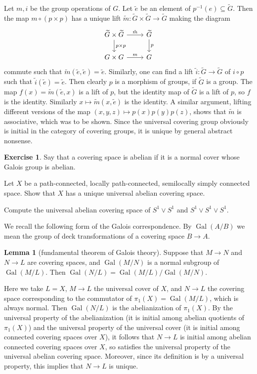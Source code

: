 \documentclass[10pt]{article}
\DeclareMathOperator{\Gal}{Gal}
\theoremstyle{definition}
\newtheorem{exer}{Exercise}
\newtheorem{lemma}{Lemma}[exer]
\begin{document}
Let $m,i$ be the group operations of $G$. Let $\tilde e$ be an element of $p^{-1}(e) \subseteq \widetilde G$.
Then the map $m \circ (p \times p)$ has a unique lift $\tilde m: \widetilde G \times \widetilde G \to \widetilde G$ making the diagram
$$\begin{tikzcd}
\widetilde G \times \widetilde G \arrow[r, "\tilde m"] \arrow[d,"p \times p"] & \widetilde G \arrow[d,"p"]\\
G \times G \arrow[r,"m"] & G
\end{tikzcd}$$
commute such that $\tilde m(\tilde e, \tilde e) = \tilde e$.
Similarly, one can find a lift $\tilde i: \widetilde G \to \widetilde G$ of $i \circ p$ such that $\tilde i(\tilde e) = \tilde e$.
Then clearly $p$ is a morphism of groups, if $\tilde G$ is a group.
The map $f(x) = \tilde m(\tilde e, x)$ is a lift of $p$, but the identity map of $\tilde G$ is a lift of $p$, so $f$ is the identity.
Similarly $x \mapsto \tilde m(x, \tilde e)$ is the identity.
A similar argument, lifting different versions of the map $(x, y, z) \mapsto p(x)p(y)p(z)$, shows that $\tilde m$ is associative, which was to be shown.
Since the universal covering group obviously is initial in the category of covering groups, it is unique by general abstract nonsense.

\begin{exer}
Say that a covering space is abelian if it is a normal cover whose Galois group is abelian.

Let $X$ be a path-connected, locally path-connected, semilocally simply connected space.
Show that $X$ has a unique universal abelian covering space.

Compute the universal abelian covering space of $S^1 \vee S^1$ and $S^1 \vee S^1 \vee S^1$.
\end{exer}

We recall the following form of the Galois correspondence. By $\Gal(A/B)$ we mean the group of deck transformations of a covering space $B \to A$.

\begin{lemma}[fundamental theorem of Galois theory]
Suppose that $M \to N$ and $N \to L$ are covering spaces, and $\Gal(M/N)$ is a normal subgroup of $\Gal(M/L)$.
Then $\Gal(N/L) = \Gal(M/L)/\Gal(M/N)$.
\end{lemma}

Here we take $L = X$, $M \to L$ the universal cover of $X$, and $N \to L$ the covering space corresponding to the commutator of $\pi_1(X) = \Gal(M/L)$, which is always normal.
Then $\Gal(N/L)$ is the abelianization of $\pi_1(X)$.
By the universal property of the abelianization (it is initial among abelian quotients of $\pi_1(X)$) and the universal property of the universal cover (it is initial among connected covering spaces over $X$), it follows that $N \to L$ is initial among abelian connected covering spaces over $X$, so satisfies the universal property of the universal abelian covering space.
Moreover, since its definition is by a universal property, this implies that $N \to L$ is unique.
\end{document}
